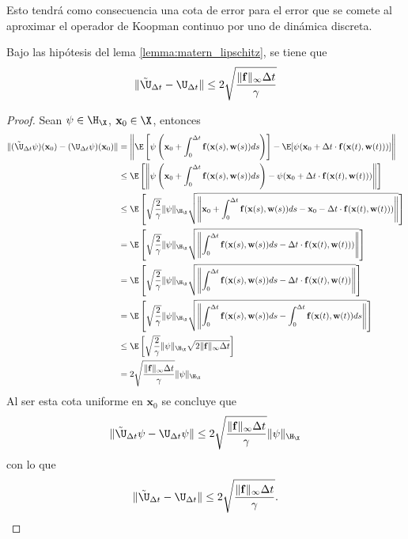 Esto tendrá como consecuencia una cota de error para el error que se comete al aproximar el operador de Koopman continuo por uno de dinámica discreta. 

\begin{prop}
    Bajo las hipótesis del lema \ref{lemma:matern_lipschitz}, se tiene que
    \[
    \| \Tilde{\U}_{\Delta t} - \U_{\Delta t} \| \leq 2 \sqrt{\frac{\| \mathbf{f} \|_\infty \Delta t }{\gamma}} 
    \]
    \label{prop:aprox_koop_cont_disc}
\end{prop}

\begin{proof}
    Sean $\psi \in \H_\X$, $\mathbf{x}_0 \in \X$, entonces
    \[
    \begin{aligned}
        \| (\Tilde{\U}_{\Delta t}\psi)(\mathbf{x}_0) - (\U_{\Delta t} \psi)(\mathbf{x}_0) \| &= \left  \| \E \left [\psi \left ( \mathbf{x}_0 + \int_0^{\Delta t} \mathbf{f}(\mathbf{x}(s), \mathbf{w}(s)) ds \right ) \right ] - \E [\psi(\mathbf{x}_0 + \Delta t \cdot \mathbf{f}(\mathbf{x}(t), \mathbf{w}(t)))] \right \| \\
        &\leq \E \left [ \left \| \psi \left ( \mathbf{x}_0 + \int_0^{\Delta t} \mathbf{f}(\mathbf{x}(s), \mathbf{w}(s)) ds \right ) - \psi(\mathbf{x}_0 + \Delta t \cdot \mathbf{f}(\mathbf{x}(t), \mathbf{w}(t))) \right \| \right ] \\
        &\leq \E \left [ \sqrt{\frac{2}{\gamma}} \| \psi \|_{\H_\X} \sqrt{ \left \| \mathbf{x}_0 + \int_0^{\Delta t} \mathbf{f}(\mathbf{x}(s), \mathbf{w}(s)) ds - \mathbf{x}_0 - \Delta t \cdot \mathbf{f}(\mathbf{x}(t), \mathbf{w}(t)))\right \|} \right ] \\
        &= \E \left [ \sqrt{\frac{2}{\gamma}} \| \psi \|_{\H_\X} \sqrt{ \left \| \int_0^{\Delta t} \mathbf{f}(\mathbf{x}(s), \mathbf{w}(s)) ds - \Delta t \cdot \mathbf{f}(\mathbf{x}(t), \mathbf{w}(t)))\right \|} \right ] \\
        &= \E \left [ \sqrt{\frac{2}{\gamma}} \| \psi \|_{\H_\X} \sqrt{ \left \| \int_0^{\Delta t} \mathbf{f}(\mathbf{x}(s), \mathbf{w}(s)) ds - \Delta t \cdot \mathbf{f}(\mathbf{x}(t), \mathbf{w}(t)) \right \|} \right ] \\
        &= \E \left [ \sqrt{\frac{2}{\gamma}} \| \psi \|_{\H_\X} \sqrt{ \left \| \int_0^{\Delta t} \mathbf{f}(\mathbf{x}(s), \mathbf{w}(s)) ds - \int_0^{\Delta t} \mathbf{f}(\mathbf{x}(t), \mathbf{w}(t)) ds \right \|} \right ] \\
        &\leq \E \left [ \sqrt{\frac{2}{\gamma}} \| \psi \|_{\H_\X} \sqrt{ 2 \| \mathbf{f} \|_\infty \Delta t } \right ] \\
        &= 2 \sqrt{\frac{\| \mathbf{f} \|_\infty \Delta t}{\gamma}} \| \psi \|_{\H_\X}  
     \end{aligned}
    \]
    Al ser esta cota uniforme en $\mathbf{x}_0$ se concluye que
    \[
    \| \Tilde{\U}_{\Delta t}\psi - \U_{\Delta t} \psi \| \leq 2 \sqrt{\frac{\| \mathbf{f} \|_\infty \Delta t}{\gamma}} \| \psi \|_{\H_\X}\] 
    con lo que
    \[
    \| \Tilde{\U}_{\Delta t} - \U_{\Delta t} \| \leq 2 \sqrt{\frac{\| \mathbf{f} \|_\infty \Delta t}{\gamma}}. \] 
\end{proof}

